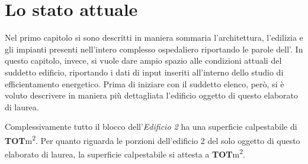 \chapter{Lo stato attuale}
\thispagestyle{empty}

Nel primo capitolo si sono descritti in maniera sommaria l'architettura, l'edilizia e gli impianti presenti nell'intero complesso ospedaliero riportando le parole dell'. In questo capitolo, invece, si vuole dare ampio spazio alle condizioni attuali del suddetto edificio, riportando i dati di input inseriti all'interno dello studio di efficientamento energetico. Prima di iniziare con il suddetto elenco, però, si è voluto descrivere in maniera più dettagliata l'edificio oggetto di questo elaborato di laurea.

Complessivamente tutto il blocco dell'\emph{Edificio 2} ha una superficie calpestabile di \textbf{TOT}\si{m^2}. Per quanto riguarda le porzioni dell'edificio 2 del solo oggetto di questo elaborato di laurea, la superficie calpestabile si attesta a \textbf{TOT}\si{m^2}.


